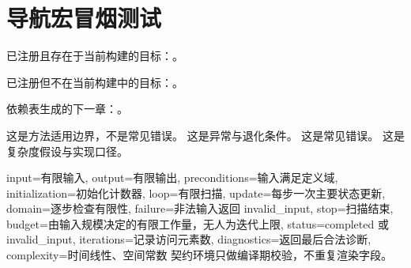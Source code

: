 \documentclass[UTF8,a4paper,11pt,openany]{ctexbook}
\begin{document}
\setcounter{chapter}{31}
\chapter{导航宏冒烟测试}\label{chap:V5-C03}

已注册且存在于当前构建的目标：。

已注册但不在当前构建中的目标：。

依赖表生成的下一章：。

\SLMethodLimitationsHeading 这是方法适用边界，不是常见错误。
\SLDegeneracyHeading 这是异常与退化条件。
\SLCommonErrorsHeading 这是常见错误。
\SLComplexityAssumptionsHeading 这是复杂度假设与实现口径。

\begin{AlgorithmContract}{
  input={有限输入},
  output={有限输出},
  preconditions={输入满足定义域},
  initialization={初始化计数器},
  loop={有限扫描},
  update={每步一次主要状态更新},
  domain={逐步检查有限性},
  failure={非法输入返回 invalid_input},
  stop={扫描结束},
  budget={由输入规模决定的有限工作量，无人为迭代上限},
  status={completed 或 invalid_input},
  iterations={记录访问元素数},
  diagnostics={返回最后合法诊断},
  complexity={时间线性、空间常数}
}
契约环境只做编译期校验，不重复渲染字段。
\end{AlgorithmContract}
\end{document}
